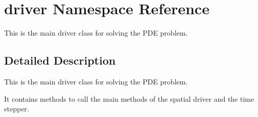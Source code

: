 \hypertarget{namespacedriver}{}\section{driver Namespace Reference}
\label{namespacedriver}


This is the main driver class for solving the P\+DE problem.  




\subsection{Detailed Description}
This is the main driver class for solving the P\+DE problem. 

It contains methods to call the main methods of the spatial driver and the time stepper. 